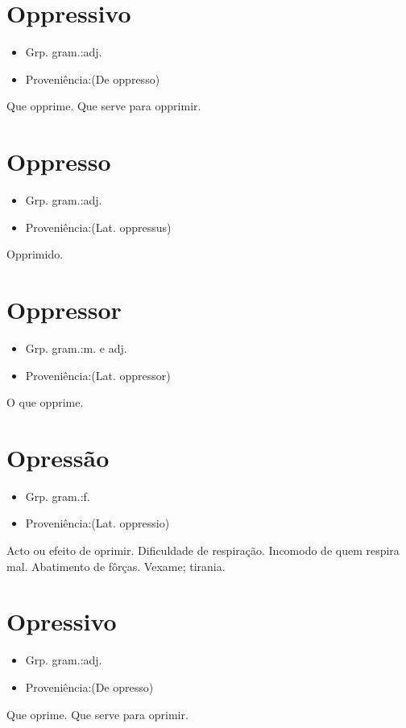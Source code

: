 \section{Oppressivo}
\begin{itemize}
\item {Grp. gram.:adj.}
\end{itemize}
\begin{itemize}
\item {Proveniência:(De \textunderscore oppresso\textunderscore )}
\end{itemize}
Que opprime.
Que serve para opprimir.
\section{Oppresso}
\begin{itemize}
\item {Grp. gram.:adj.}
\end{itemize}
\begin{itemize}
\item {Proveniência:(Lat. \textunderscore oppressus\textunderscore )}
\end{itemize}
Opprimido.
\section{Oppressor}
\begin{itemize}
\item {Grp. gram.:m.  e  adj.}
\end{itemize}
\begin{itemize}
\item {Proveniência:(Lat. \textunderscore oppressor\textunderscore )}
\end{itemize}
O que opprime.
\section{Opressão}
\begin{itemize}
\item {Grp. gram.:f.}
\end{itemize}
\begin{itemize}
\item {Proveniência:(Lat. \textunderscore oppressio\textunderscore )}
\end{itemize}
Acto ou efeito de oprimir.
Dificuldade de respiração.
Incomodo de quem respira mal.
Abatimento de fôrças.
Vexame; tirania.
\section{Opressivo}
\begin{itemize}
\item {Grp. gram.:adj.}
\end{itemize}
\begin{itemize}
\item {Proveniência:(De \textunderscore opresso\textunderscore )}
\end{itemize}
Que oprime.
Que serve para oprimir.
